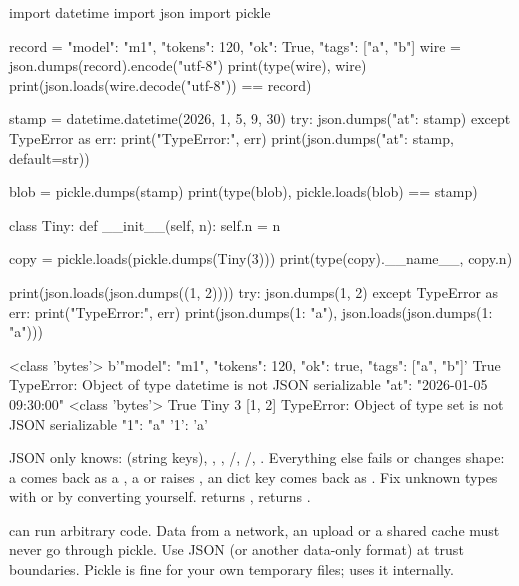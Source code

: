 \begin{pycode}
import datetime
import json
import pickle

record = {"model": "m1", "tokens": 120, "ok": True, "tags": ["a", "b"]}
wire = json.dumps(record).encode("utf-8")
print(type(wire), wire)
print(json.loads(wire.decode("utf-8")) == record)

stamp = datetime.datetime(2026, 1, 5, 9, 30)
try:
    json.dumps({"at": stamp})
except TypeError as err:
    print("TypeError:", err)
print(json.dumps({"at": stamp}, default=str))

blob = pickle.dumps(stamp)
print(type(blob), pickle.loads(blob) == stamp)

class Tiny:
    def __init__(self, n):
        self.n = n

copy = pickle.loads(pickle.dumps(Tiny(3)))
print(type(copy).__name__, copy.n)

print(json.loads(json.dumps((1, 2))))
try:
    json.dumps({1, 2})
except TypeError as err:
    print("TypeError:", err)
print(json.dumps({1: "a"}), json.loads(json.dumps({1: "a"})))
\end{pycode}
\begin{rawcode}
<class 'bytes'> b'{"model": "m1", "tokens": 120, "ok": true, "tags": ["a", "b"]}'
True
TypeError: Object of type datetime is not JSON serializable
{"at": "2026-01-05 09:30:00"}
<class 'bytes'> True
Tiny 3
[1, 2]
TypeError: Object of type set is not JSON serializable
{"1": "a"} {'1': 'a'}
\end{rawcode}

\begin{typecheck}
JSON only knows:  (string keys), , , /,
/, . Everything else fails or changes shape:
a  comes back as a , a  or  raises
, an  dict key comes back as . Fix unknown types with
 or by converting yourself.  returns ,
 returns .
\end{typecheck}

\begin{trap}
 can run arbitrary code. Data from a network, an upload or a shared
cache must never go through pickle. Use JSON (or another data-only format) at trust
boundaries. Pickle is fine for your own temporary files;  uses it
internally.
\end{trap}

